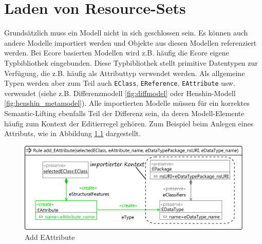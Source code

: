 \chapter{Laden von Resource-Sets}
\label{resource_sets}

Grundsätzlich muss ein Modell nicht in sich geschlossen sein. Es können auch andere Modelle
importiert werden und Objekte aus diesen Modellen referenziert werden. Bei Ecore basierten Modellen
wird z.B. häufig die Ecore eigene Typbibliothek eingebunden. Diese Typbibliothek stellt primitive
Datentypen zur Verfügung, die z.B. häufig als Attributtyp verwendet werden. Als allgemeine Typen
werden aber zum Teil auch \texttt{EClass}, \texttt{EReference}, \texttt{EAttribute} usw.
verwendet (siehe z.B. Differenzmodell \ref{fig:diffmodel} oder Henshin-Modell
\ref{fig:henshin_metamodel}). Alle importierten Modelle müssen für ein korrektes Semantic-Lifting
ebenfalls Teil der Differenz sein, da deren Modell-Elemente häufig zum Kontext der Editierregel
gehören. Zum Beispiel beim Anlegen eines Attributs, wie in Abbildung \ref{fig:add_eattribute_rule}
dargestellt.

\begin{figure}[htb]
  \centering \includegraphics[width=1.0\textwidth]{images/add_eattribute.png}
  \caption{Add EAttribute}
  \label{fig:add_eattribute_rule}
\end{figure}

